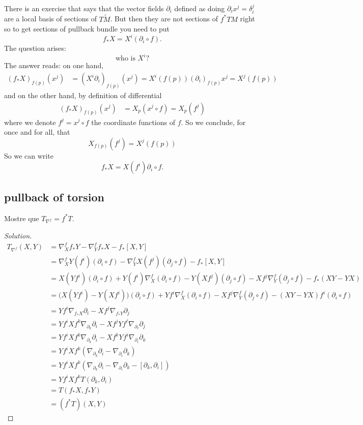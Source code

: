 There is an exercise that says that the vector fields \(\partial_i\) defined as doing \(\partial_i x^j=\delta_i^j\) are a local basis of sections of \(T\tilde{M}\). But then they are not sections of \(f^*TM\) right so to get sections of pullback bundle you need to put
\[f_* X=X^i(\partial_i \circ f).\]
The question arises:
\[\text{who is } X^i\text{?} \]
The answer reads: on one hand,
\begin{align*}
	(f_*X)_{f(p)}(x^j)&=(X^i \partial_i)_{f(p)}(x^j)=X^i(f(p))(\partial_i)_{f(p)}x^j=X^j(f(p))
\end{align*}
and on the other hand, by definition of differential
\begin{align*}
	(f_*X)_{f(p)}(x^j)&=X_p(x^j\circ f)=X_p(f^j)
\end{align*}
where we denote \(f^j=x^j \circ f\) the coordinate functions of \(f\). So we conclude, for once and for all, that
\[X_{f(p)}(f^j)=X^j(f(p))\]
So we can write
\[f_*X=X(f^i)\partial_i \circ f .\]

\subsection{pullback of torsion}

\begin{exercise}\leavevmode
Mostre que \(T_{\nabla^f}=f^*T\).
\end{exercise}

\begin{proof}[Solution]

\begin{align*}
	T_{\nabla^f}(X,Y)&=\nabla^f_X f_*Y-\nabla^f_Yf_*X-f_*[X,Y]\\
			 &=\nabla^f_XY(f^i)(\partial_i \circ f)-\nabla^f_YX(f^j)(\partial_j\circ f)-f_*[X,Y]\\
			 &=X(Yf^i)(\partial_i \circ f)+Y(f^i)\nabla^f_X(\partial_i \circ f)-Y(Xf^j)(\partial_j\circ f)-Xf^j \nabla^f_Y (\partial_j \circ f)-f_*(XY-YX)\\
			 &=\Big(X(Yf^i)-Y(Xf^i)\Big)(\partial_i \circ f)+Yf^i\nabla^f_X(\partial_i \circ f)-Xf^j\nabla^f_Y(\partial_j \circ f)-(XY-YX)f^i(\partial_i \circ f)\\
			 &=Yf^i \nabla_{f_*X}\partial_i-Xf^j \nabla_{f_*Y}\partial_j\\
&=Yf^iXf^k\nabla_{\partial_k}\partial_i-Xf^jYf^\ell \nabla_{\partial_\ell}\partial_j\\
&=Yf^iXf^k \nabla_{\partial_k}\partial_i-Xf^kYf^i \nabla_{\partial_i}\partial_k\\
&=Yf^iXf^k(\nabla_{\partial_k}\partial_i-\nabla_{\partial_i}\partial_k)\\
&=Yf^iXf^k(\nabla_{\partial_k}\partial_i-\nabla_{\partial_i}\partial_k-[\partial_k,\partial_i])\\
&=Yf^iXf^kT(\partial_k,\partial_i)\\
&=T(f_*X,f_*Y)\\
&=(f^*T)(X,Y)
\end{align*}
\end{proof}

